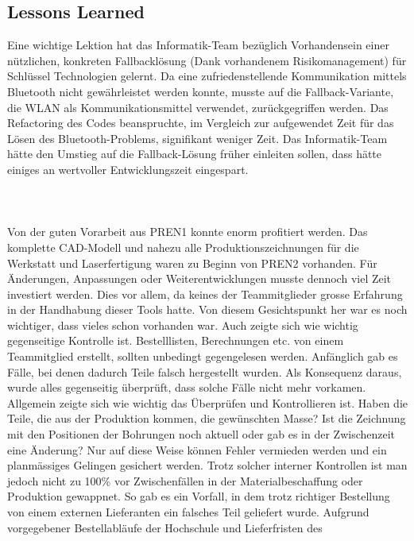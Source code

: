 \subsection{Lessons Learned}
Eine wichtige Lektion hat das Informatik-Team bezüglich Vorhandensein einer nützlichen, 
konkreten Fallbacklösung (Dank vorhandenem Risikomanagement) für Schlüssel Technologien gelernt. 
Da eine zufriedenstellende Kommunikation mittels Bluetooth nicht gewährleistet werden konnte, 
musste auf die Fallback-Variante, die WLAN als Kommunikationsmittel verwendet, zurückgegriffen werden. 
Das Refactoring des Codes beanspruchte, im Vergleich zur aufgewendet Zeit für das Lösen des Bluetooth-Problems, 
signifikant weniger Zeit. Das Informatik-Team hätte den Umstieg auf die Fallback-Lösung früher einleiten sollen, 
dass hätte einiges an wertvoller Entwicklungszeit eingespart.
\\
\\

\\
\\
Von der guten Vorarbeit aus PREN1 konnte enorm profitiert werden. Das komplette CAD-Modell und 
nahezu alle Produktionszeichnungen für die Werkstatt und Laserfertigung waren zu Beginn von PREN2 vorhanden. 
Für Änderungen, Anpassungen oder Weiterentwicklungen musste dennoch viel Zeit investiert werden. 
Dies vor allem, da keines der Teammitglieder grosse Erfahrung in der Handhabung dieser Tools hatte. 
Von diesem Gesichtspunkt her war es noch wichtiger, dass vieles schon vorhanden war. Auch zeigte sich wie 
wichtig gegenseitige Kontrolle ist. Bestelllisten, Berechnungen etc. von einem Teammitglied erstellt, sollten 
unbedingt gegengelesen werden. Anfänglich gab es Fälle, bei denen dadurch Teile falsch hergestellt wurden. 
Als Konsequenz daraus, wurde alles gegenseitig überprüft, dass solche Fälle nicht mehr vorkamen. Allgemein 
zeigte sich wie wichtig das Überprüfen und Kontrollieren ist. Haben die Teile, die aus der Produktion kommen, 
die gewünschten Masse? Ist die Zeichnung mit den Positionen der Bohrungen noch aktuell oder gab es in der 
Zwischenzeit eine Änderung? Nur auf diese Weise können Fehler vermieden werden und ein planmässiges Gelingen gesichert werden. 
Trotz solcher interner Kontrollen ist man jedoch nicht zu 100\% vor Zwischenfällen in der Materialbeschaffung 
oder Produktion gewappnet. So gab es ein Vorfall, in dem trotz richtiger Bestellung von einem externen Lieferanten 
ein falsches Teil geliefert wurde. Aufgrund vorgegebener Bestellabläufe der Hochschule und Lieferfristen des 
